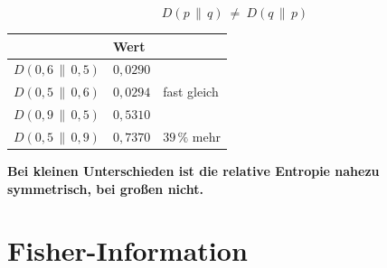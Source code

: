 \begin{warnung}
\[ D(p\,\|\,q) \ \ne\ D(q\,\|\,p) \]

\begin{center}
{\small
\renewcommand{\arraystretch}{1.48}
\begin{tabular}{@{}P{2.6cm}P{2.2cm}P{2.6cm}@{}}
\toprule
& \textbf{Wert} & \\
\midrule
$D(0{,}6\,\|\,0{,}5)$ & $0{,}0290$ & \\
$D(0{,}5\,\|\,0{,}6)$ & $0{,}0294$ & fast gleich\\
\midrule
$D(0{,}9\,\|\,0{,}5)$ & $0{,}5310$ & \\
$D(0{,}5\,\|\,0{,}9)$ & $0{,}7370$ & \textcolor{akzent}{$39\,\%$ mehr}\\
\bottomrule
\end{tabular}}
\end{center}

\begin{center}
\begin{minipage}{0.9\textwidth}
\textbf{Bei kleinen Unterschieden ist die relative Entropie nahezu symmetrisch, bei großen nicht.}
\end{minipage}
\end{center}

\begin{center}
\begin{minipage}{0.88\textwidth}
\end{minipage}
\end{center}
\end{warnung}

\section{Fisher-Information}

